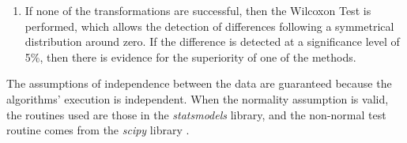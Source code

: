 \begin{enumerate}
					\item If none of the transformations are successful, then the Wilcoxon Test is performed, which allows the detection of differences following a symmetrical distribution around zero. If the difference is detected at a significance level of 5\%, then there is evidence for the superiority of one of the methods.
				\end{enumerate}
				The assumptions of independence between the data are guaranteed because the algorithms' execution is independent. When the normality assumption is valid, the routines used are those in the \textit{statsmodels} library, and the non-normal test routine comes from the \textit{scipy} library \citep{scipy}.
				
